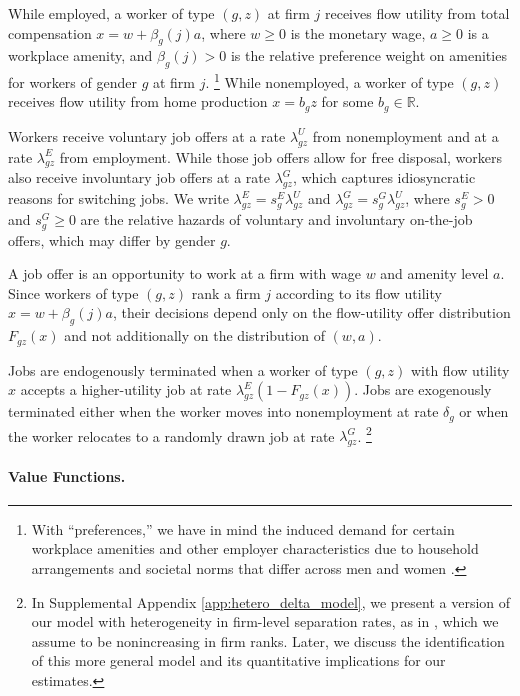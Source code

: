 While employed, a worker of type $(g, z)$ at firm $j$ receives flow utility from total compensation $x = w + \beta_{g}(j) a$, where $w \ge 0$ is the monetary wage, $a \ge 0$ is a workplace amenity, and $\beta_{g}(j) > 0$ is the relative preference weight on amenities for workers of gender $g$ at firm $j$.%
%
\footnote{With ``preferences,'' we have in mind the induced demand for certain workplace amenities and other employer characteristics due to household arrangements and societal norms that differ across men and women \citep{Goldin2014, Goldin2024}.} %
%
While nonemployed, a worker of type $(g, z)$ receives flow utility from home production $x = b_{g} z$ for some $b_{g} \in \mathbb{R}$.

Workers receive voluntary job offers at a rate $\lambda_{gz}^{U}$ from nonemployment and at a rate $\lambda_{gz}^{E}$ from employment. While those job offers allow for free disposal, workers also receive involuntary job offers at a rate $\lambda_{gz}^{G}$, which captures idiosyncratic reasons for switching jobs. We write $\lambda_{gz}^{E} = s_{g}^{E} \lambda_{gz}^{U}$ and $\lambda_{gz}^{G} = s_{g}^{G} \lambda_{gz}^{U}$, where $s_{g}^{E} > 0$ and $s_{g}^{G} \ge 0$ are the relative hazards of voluntary and involuntary on-the-job offers, which may differ by gender $g$.

A job offer is an opportunity to work at a firm with wage $w$ and amenity level $a$. Since workers of type $(g, z)$ rank a firm $j$ according to its flow utility $x = w + \beta_{g}(j) a$, their decisions depend only on the flow-utility offer distribution $F_{gz}(x)$ and not additionally on the distribution of $(w, a)$.

Jobs are endogenously terminated when a worker of type $(g, z)$ with flow utility $x$ accepts a higher-utility job at rate $\lambda_{gz}^{E}(1 - F_{gz}(x))$. Jobs are exogenously terminated either when the worker moves into nonemployment at rate $\delta_{g}$ or when the worker relocates to a randomly drawn job at rate $\lambda_{gz}^{G}$.%
%
\footnote{In Supplemental Appendix \ref{app:hetero_delta_model}, we present a version of our model with heterogeneity in firm-level separation rates, as in \citet{Jarosch2023}, which we assume to be nonincreasing in firm ranks. Later, we discuss the identification of this more general model and its quantitative implications for our estimates.} %
%


\paragraph{Value Functions.}

